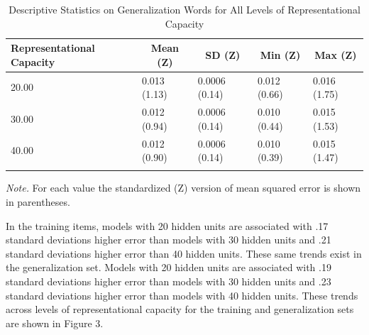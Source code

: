 \documentclass[
  ,man,floatsintext]{apa6}
\begin{document}
\begin{table}[tbp]

\begin{center}
\begin{threeparttable}

\caption{\label{tab:table5}Descriptive Statistics on Generalization Words for All Levels of Representational Capacity}

\begin{tabular}{lllll}
\toprule
Representational Capacity & \multicolumn{1}{c}{Mean (Z)} & \multicolumn{1}{c}{SD (Z)} & \multicolumn{1}{c}{Min (Z)} & \multicolumn{1}{c}{Max (Z)}\\
\midrule
20.00 & 0.013 (1.13) & 0.0006 (0.14) & 0.012 (0.66) & 0.016 (1.75)\\
30.00 & 0.012 (0.94) & 0.0006 (0.14) & 0.010 (0.44) & 0.015 (1.53)\\
40.00 & 0.012 (0.90) & 0.0006 (0.14) & 0.010 (0.39) & 0.015 (1.47)\\
\bottomrule
\addlinespace
\end{tabular}

\begin{tablenotes}[para]
\normalsize{\textit{Note.} For each value the standardized (Z) version of mean squared error is shown in parentheses.}
\end{tablenotes}

\end{threeparttable}
\end{center}

\end{table}

In the training items, models with 20 hidden units are associated with .17 standard deviations higher error than models with 30 hidden units and .21 standard deviations higher error than 40 hidden units. These same trends exist in the generalization set. Models with 20 hidden units are associated with .19 standard deviations higher error than models with 30 hidden units and .23 standard deviations higher error than models with 40 hidden units. These trends across levels of representational capacity for the training and generalization sets are shown in Figure 3.
\end{document}
